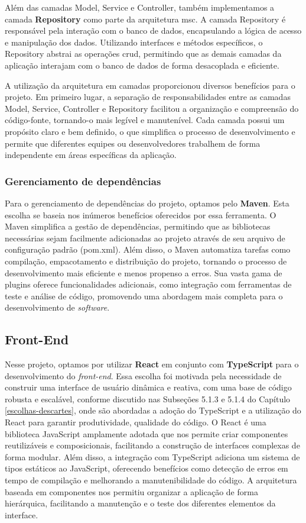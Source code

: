 Além das camadas Model, Service e Controller, também implementamos a camada \textbf{Repository} como parte da arquitetura \ac{msc}. A camada Repository é responsável pela interação com o banco de dados, encapsulando a lógica de acesso e manipulação dos dados. Utilizando interfaces e métodos específicos, o Repository abstrai as operações \ac{crud}, permitindo que as demais camadas da aplicação interajam com o banco de dados de forma desacoplada e eficiente.

A utilização da arquitetura em camadas proporcionou diversos benefícios para o projeto. Em primeiro lugar, a separação de responsabilidades entre as camadas Model, Service, Controller e Repository facilitou a organização e compreensão do código-fonte, tornando-o mais legível e manutenível. Cada camada possui um propósito claro e bem definido, o que simplifica o processo de desenvolvimento e permite que diferentes equipes ou desenvolvedores trabalhem de forma independente em áreas específicas da aplicação.

\subsubsection{Gerenciamento de dependências}
Para o gerenciamento de dependências do projeto, optamos pelo \textbf{Maven}. Esta escolha se baseia nos inúmeros benefícios oferecidos por essa ferramenta. O Maven simplifica a gestão de dependências, permitindo que as bibliotecas necessárias sejam facilmente adicionadas ao projeto através de seu arquivo de configuração padrão (pom.xml). Além disso, o Maven automatiza tarefas como compilação, empacotamento e distribuição do projeto, tornando o processo de desenvolvimento mais eficiente e menos propenso a erros. Sua vasta gama de plugins oferece funcionalidades adicionais, como integração com ferramentas de teste e análise de código, promovendo uma abordagem mais completa para o desenvolvimento de \textit{software}. 

\subsection{Front-End}
Nesse projeto, optamos por utilizar \textbf{React} em conjunto com \textbf{TypeScript} para o desenvolvimento do \textit{front-end}. Essa escolha foi motivada pela necessidade de construir uma interface de usuário dinâmica e reativa, com uma base de código robusta e escalável, conforme discutido nas Subseções 5.1.3 e 5.1.4 do Capítulo \ref{escolhas-descartes}, onde são abordadas a adoção do TypeScript e a utilização do React para garantir produtividade, qualidade do código. O React é uma biblioteca JavaScript amplamente adotada que nos permite criar componentes reutilizáveis e composicionais, facilitando a construção de interfaces complexas de forma modular. Além disso, a integração com TypeScript adiciona um sistema de tipos estáticos ao JavaScript, oferecendo benefícios como detecção de erros em tempo de compilação e melhorando a manutenibilidade do código. A arquitetura baseada em componentes nos permitiu organizar a aplicação de forma hierárquica, facilitando a manutenção e o teste dos diferentes elementos da interface.

